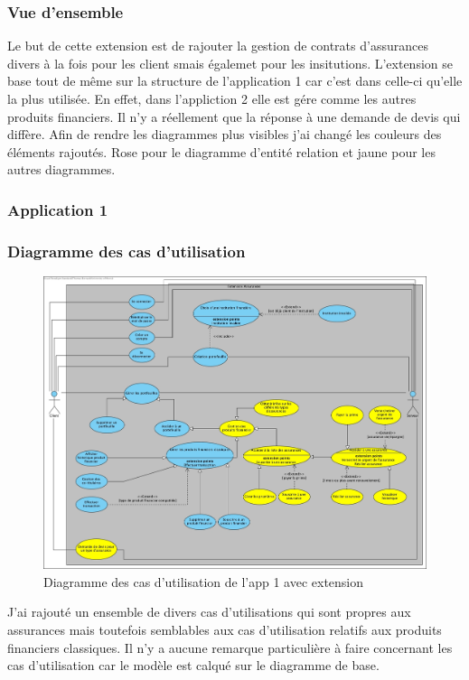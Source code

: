 \documentclass[../rapport.tex]{subfiles}
\begin{document}
		\subsubsection{Vue d'ensemble}
		Le but de cette extension est de rajouter la gestion de contrats d'assurances divers
		à la fois pour les client smais égalemet pour les insitutions. L'extension se base tout
		de même sur la structure de l'application 1 car c'est dans celle-ci qu'elle la plus 
		utilisée. En effet, dans l'appliction 2 elle est gére comme les autres produits 
		financiers. Il n'y a réellement que la réponse à une demande de devis qui diffère.
		Afin de rendre les diagrammes plus visibles j'ai changé les couleurs des éléments rajoutés. 
		Rose pour le diagramme d'entité relation et jaune pour les autres diagrammes.

		\subsubsection{Application 1}

		\subsubsection{Diagramme des cas d'utilisation}
				\begin{figure}[h]
						\centering\includegraphics[scale=0.27]{ressources/photos_diagrammes/extensionThomas/useCase1Thomas.jpg}
						\caption{Diagramme des cas d'utilisation de l'app 1 avec extension}
				\end{figure}
		J'ai rajouté un ensemble de divers cas d'utilisations qui sont propres aux assurances
		mais toutefois semblables aux cas d'utilisation relatifs aux produits financiers
		classiques. Il n'y a aucune remarque particulière à faire concernant les cas
		d'utilisation car le modèle est calqué sur le diagramme de base.
\newpage
\end{document}
